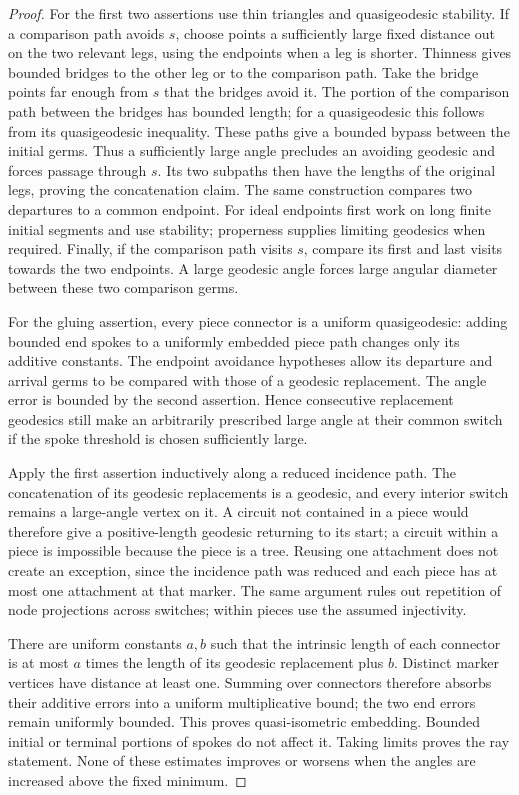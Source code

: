 \begin{proof}
For the first two assertions use thin triangles and quasigeodesic
stability.  If a comparison path avoids $s$, choose points a sufficiently
large fixed distance out on the two relevant legs, using the endpoints
when a leg is shorter.  Thinness gives bounded bridges to the other
leg or to the comparison path.  Take the bridge points far enough
from $s$ that the bridges avoid it.  The portion of the comparison path
between the bridges has bounded length; for a quasigeodesic this follows
from its quasigeodesic inequality.  These paths give a bounded bypass
between the initial germs.  Thus a sufficiently large angle precludes
an avoiding geodesic and forces passage through $s$.  Its two subpaths
then have the lengths of the original legs, proving the concatenation
claim.  The same construction compares two departures to a common
endpoint.  For ideal endpoints first work on long finite initial
segments and use stability; properness supplies limiting geodesics
when required.  Finally, if the comparison path visits $s$, compare its
first and last visits towards the two endpoints.  A large geodesic
angle forces large angular diameter between these two comparison
germs.

For the gluing assertion, every piece connector is a uniform
quasigeodesic: adding bounded end spokes to a uniformly embedded
piece path changes only its additive constants.  The endpoint
avoidance hypotheses allow its departure and arrival germs to be
compared with those of a geodesic replacement.  The angle error is
bounded by the second assertion.  Hence consecutive replacement
geodesics still make an arbitrarily prescribed large angle at their
common switch if the spoke threshold is chosen sufficiently large.

Apply the first assertion inductively along a reduced incidence path.
The concatenation of its geodesic replacements is a geodesic, and
every interior switch remains a large-angle vertex on it.  A circuit
not contained in a piece would therefore give a positive-length
geodesic returning to its start; a circuit within a piece is impossible
because the piece is a tree.  Reusing one attachment does not create an
exception, since the incidence path was reduced and each piece has at
most one attachment at that marker.  The same argument rules out
repetition of node projections across switches; within pieces use the
assumed injectivity.

There are uniform constants $a,b$ such that the intrinsic length of
each connector is at most $a$ times the length of its geodesic
replacement plus $b$.  Distinct marker vertices have distance at least
one.  Summing over connectors therefore absorbs their additive errors
into a uniform multiplicative bound; the two end errors remain
uniformly bounded.  This proves quasi-isometric embedding.  Bounded
initial or terminal portions of spokes do not affect it.  Taking limits
proves the ray statement.  None of these estimates improves or worsens
when the angles are increased above the fixed minimum.
\end{proof}

